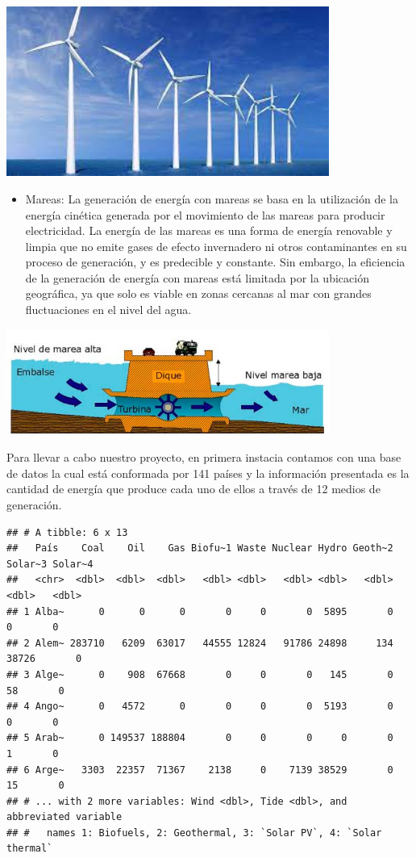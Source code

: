 \documentclass[
]{article}
\providecommand{\tightlist}{%
  \setlength{\itemsep}{0pt}\setlength{\parskip}{0pt}}
\begin{document}
\includegraphics[width=4.16667in,height=\textheight]{viento2.jpeg}

\begin{itemize}
\tightlist
\item
  Mareas: La generación de energía con mareas se basa en la utilización
  de la energía cinética generada por el movimiento de las mareas para
  producir electricidad. La energía de las mareas es una forma de
  energía renovable y limpia que no emite gases de efecto invernadero ni
  otros contaminantes en su proceso de generación, y es predecible y
  constante. Sin embargo, la eficiencia de la generación de energía con
  mareas está limitada por la ubicación geográfica, ya que solo es
  viable en zonas cercanas al mar con grandes fluctuaciones en el nivel
  del agua.
\end{itemize}

\includegraphics[width=4.16667in,height=\textheight]{mareas.jpeg}

Para llevar a cabo nuestro proyecto, en primera instacia contamos con
una base de datos la cual está conformada por 141 países y la
información presentada es la cantidad de energía que produce cada uno de
ellos a través de 12 medios de generación.

\begin{verbatim}
## # A tibble: 6 x 13
##   País    Coal    Oil    Gas Biofu~1 Waste Nuclear Hydro Geoth~2 Solar~3 Solar~4
##   <chr>  <dbl>  <dbl>  <dbl>   <dbl> <dbl>   <dbl> <dbl>   <dbl>   <dbl>   <dbl>
## 1 Alba~      0      0      0       0     0       0  5895       0       0       0
## 2 Alem~ 283710   6209  63017   44555 12824   91786 24898     134   38726       0
## 3 Alge~      0    908  67668       0     0       0   145       0      58       0
## 4 Ango~      0   4572      0       0     0       0  5193       0       0       0
## 5 Arab~      0 149537 188804       0     0       0     0       0       1       0
## 6 Arge~   3303  22357  71367    2138     0    7139 38529       0      15       0
## # ... with 2 more variables: Wind <dbl>, Tide <dbl>, and abbreviated variable
## #   names 1: Biofuels, 2: Geothermal, 3: `Solar PV`, 4: `Solar thermal`
\end{verbatim}
\end{document}
